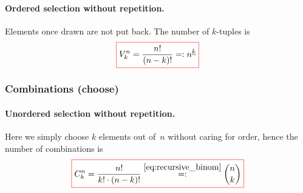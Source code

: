 \paragraph{Ordered selection without repetition.} \label{par:variations_without_repetition}
Elements once drawn are not put back.  
The number of $k$-tuples is
\begin{equation}\label{eq:variations_without_repetition}
  \fcolorbox{red}{white}{$\displaystyle
  V^n_k
  =
  \frac{n!}{(n-k)!}
  =: 
  n^{\underline{k}} 
  $}
\end{equation}

\subsubsection{Combinations (choose)}

\paragraph{Unordered selection without repetition.} \label{par:combinations_without_repetition}
Here we simply choose $k$ elements out of~$n$ without caring for order, hence the number of combinations is
\begin{equation}\label{eq:combinations_without_repetition}
  \fcolorbox{red}{white}{$\displaystyle
  C^n_k
  =
  \frac{n!}{k! \cdot (n-k)!}
  \overset{\eqref{eq:recursive_binom}}{=:}
  \binom{n}{k}
  $}
\end{equation}

